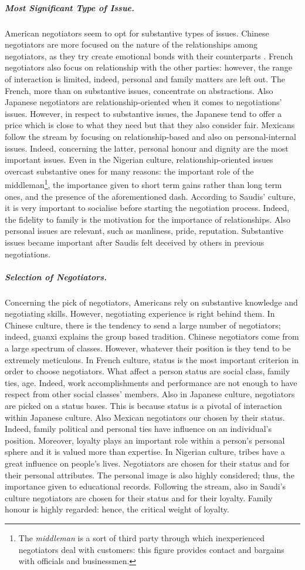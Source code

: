 \documentclass[../main.tex]{subfiles}
\begin{document}
\subparagraph{Most Significant Type of Issue.} American negotiators seem to opt for substantive types of issues. Chinese negotiators are more focused on the nature of the relationships among negotiators, as they try create emotional bonds with their counterparts \autocite[66]{stripp}. French negotiators also focus on relationship with the other parties: however, the range of interaction is limited, indeed, personal and family matters are left out. The French, more than on substantive issues, concentrate on abstractions. Also Japanese negotiators are relationship-oriented when it comes to negotiations' issues. However, in respect to substantive issues, the Japanese tend to offer a price which is close to what they need but that they also consider fair. Mexicans follow the stream by focusing on relationship-based and also on personal-internal issues. Indeed, concerning the latter, personal honour and dignity are the most important issues. Even in the Nigerian culture, relationship-oriented issues overcast substantive ones for many reasons: the important role of the middleman\footnote{The \textit{middleman} is a sort of third party through which inexperienced negotiators deal with customers: this figure provides contact and bargains with officials and businessmen.}, the importance given to short term gains rather than long term ones, and the presence of the aforementioned dash. According to Saudis' culture, it is very important to socialise before starting the negotiation process. Indeed, the fidelity to family is the motivation for the importance of relationships. Also personal issues are relevant, such as manliness, pride, reputation. Substantive issues became important after Saudis felt deceived by others in previous negotiations.

\subparagraph{Selection of Negotiators.} Concerning the pick of negotiators,  Americans rely on substantive knowledge and negotiating  skills. However, negotiating experience is right behind them. In Chinese culture, there is the tendency to send a large number of negotiators; indeed, guanxi explains the group based tradition. Chinese negotiators come from a large spectrum of classes. However, whatever their position is they tend to be extremely meticulous.  In French culture,  status is the most important criterion in order to choose negotiators.  What affect a person status are social class, family ties, age. Indeed, work accomplishments and performance are not enough to have respect from other social classes' members. Also in Japanese culture,  negotiators are picked on a status bases. This is because status is a pivotal of interaction within Japanese culture. Also Mexican negotiators our chosen by their status. Indeed, family political and personal ties have influence on an individual's position. Moreover, loyalty plays an important role within a person's personal sphere and it is valued more than expertise. In Nigerian culture, tribes have a great influence on people's lives. Negotiators are chosen for their status and for their personal attributes. The personal image is also highly considered; thus, the importance given to educational records. Following the stream, also in Saudi's culture negotiators are chosen for their status and for their loyalty. Family honour is highly regarded: hence, the critical weight of loyalty.
\end{document}
